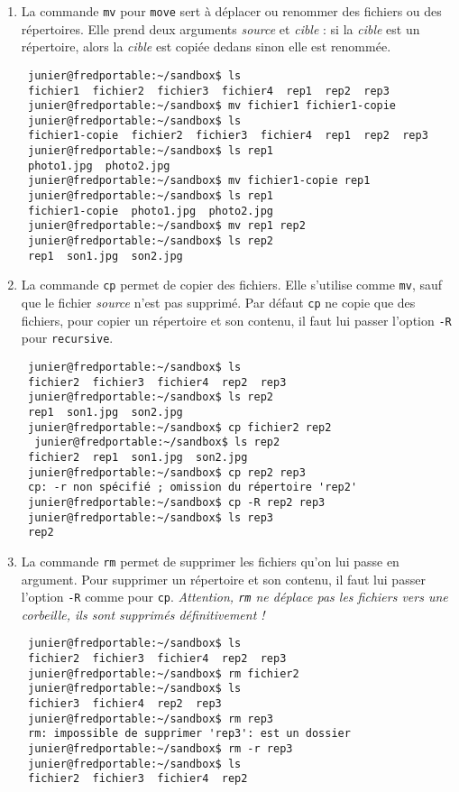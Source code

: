 \documentclass[
  11pt,
]{article}
\newcounter{def}
\begin{document}
\begin{enumerate}
\def\labelenumi{\arabic{enumi}.}
\item
  La commande \texttt{mv} pour \texttt{move} sert à déplacer ou renommer
  des fichiers ou des répertoires. Elle prend deux arguments
  \emph{source} et \emph{cible} : si la \emph{cible} est un répertoire,
  alors la \emph{cible} est copiée dedans sinon elle est renommée.

\begin{verbatim}
 junier@fredportable:~/sandbox$ ls
 fichier1  fichier2  fichier3  fichier4  rep1  rep2  rep3
 junier@fredportable:~/sandbox$ mv fichier1 fichier1-copie
 junier@fredportable:~/sandbox$ ls
 fichier1-copie  fichier2  fichier3  fichier4  rep1  rep2  rep3
 junier@fredportable:~/sandbox$ ls rep1
 photo1.jpg  photo2.jpg
 junier@fredportable:~/sandbox$ mv fichier1-copie rep1
 junier@fredportable:~/sandbox$ ls rep1
 fichier1-copie  photo1.jpg  photo2.jpg
 junier@fredportable:~/sandbox$ mv rep1 rep2
 junier@fredportable:~/sandbox$ ls rep2
 rep1  son1.jpg  son2.jpg
\end{verbatim}
\item
  La commande \texttt{cp} permet de copier des fichiers. Elle s'utilise
  comme \texttt{mv}, sauf que le fichier \emph{source} n'est pas
  supprimé. Par défaut \texttt{cp} ne copie que des fichiers, pour
  copier un répertoire et son contenu, il faut lui passer l'option
  \texttt{-R} pour \texttt{recursive}.

\begin{verbatim}
 junier@fredportable:~/sandbox$ ls
 fichier2  fichier3  fichier4  rep2  rep3
 junier@fredportable:~/sandbox$ ls rep2
 rep1  son1.jpg  son2.jpg
 junier@fredportable:~/sandbox$ cp fichier2 rep2
  junier@fredportable:~/sandbox$ ls rep2
 fichier2  rep1  son1.jpg  son2.jpg
 junier@fredportable:~/sandbox$ cp rep2 rep3
 cp: -r non spécifié ; omission du répertoire 'rep2'
 junier@fredportable:~/sandbox$ cp -R rep2 rep3
 junier@fredportable:~/sandbox$ ls rep3
 rep2
\end{verbatim}
\item
  La commande \texttt{rm} permet de supprimer les fichiers qu'on lui
  passe en argument. Pour supprimer un répertoire et son contenu, il
  faut lui passer l'option \texttt{-R} comme pour \texttt{cp}.
  \emph{Attention, \texttt{rm} ne déplace pas les fichiers vers une
  corbeille, ils sont supprimés définitivement !}

\begin{verbatim}
 junier@fredportable:~/sandbox$ ls
 fichier2  fichier3  fichier4  rep2  rep3
 junier@fredportable:~/sandbox$ rm fichier2
 junier@fredportable:~/sandbox$ ls
 fichier3  fichier4  rep2  rep3
 junier@fredportable:~/sandbox$ rm rep3
 rm: impossible de supprimer 'rep3': est un dossier
 junier@fredportable:~/sandbox$ rm -r rep3
 junier@fredportable:~/sandbox$ ls
 fichier2  fichier3  fichier4  rep2
\end{verbatim}
\end{enumerate}
\end{document}
